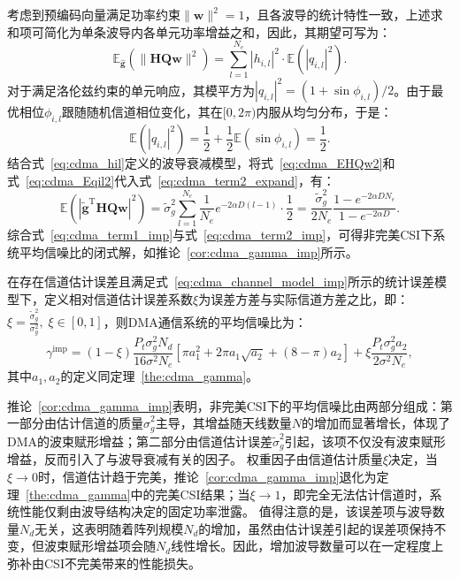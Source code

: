 考虑到预编码向量满足功率约束$\|\bm w\|^2 = 1$，且各波导的统计特性一致，上述求和项可简化为单条波导内各单元功率增益之和，因此，其期望可写为：
\begin{equation}\label{eq:cdma_EHQw2}
	\mathbb{E}_{\hat{\bm g}}\left( \|\bm H \bm Q \bm w\|^2 \right) = \sum_{l=1}^{N_e} |h_{i,l}|^2 \cdot \mathbb{E}(|q_{i,l}|^2).
\end{equation}
对于满足洛伦兹约束的单元响应，其模平方为$|q_{i,l}|^2 = (1+\sin\phi_{i,l})/2$。由于最优相位$\phi_{i,l}$跟随随机信道相位变化，其在$[0, 2\pi)$内服从均匀分布，于是：
\begin{equation}\label{eq:cdma_Eqil2}
	\mathbb{E}(|q_{i,l}|^2) = \frac{1}{2}+\frac{1}{2}\mathbb{E}(\sin\phi_{i,l})
	=\frac{1}{2}.
\end{equation}
结合式~\eqref{eq:cdma_hil}定义的波导衰减模型，将式~\eqref{eq:cdma_EHQw2}和式~\eqref{eq:cdma_Eqil2}代入式~\eqref{eq:cdma_term2_expand}，有：
\begin{equation}\label{eq:cdma_term2_imp}
	\mathbb{E}( \left| \bm{\tilde{g}}^\mathrm{T} \bm H \bm Q \bm w \right|^2 ) 
	= \tilde{\sigma}_g^2 \sum_{l=1}^{N_e} \frac{1}{N_e} e^{-2\alpha D(l-1)} \cdot \frac{1}{2} 
	= \frac{\tilde{\sigma}_g^2}{2N_e} \frac{1 - e^{-2\alpha D N_e}}{1 - e^{-2\alpha D}}.
\end{equation}
综合式~\eqref{eq:cdma_term1_imp}与式~\eqref{eq:cdma_term2_imp}，可得非完美CSI下系统平均信噪比的闭式解，如推论~\ref{cor:cdma_gamma_imp}所示。

\begin{corollary}\label{cor:cdma_gamma_imp}
	在存在信道估计误差且满足式~\eqref{eq:cdma_channel_model_imp}所示的统计误差模型下，定义相对信道估计误差系数$\xi$为误差方差与实际信道方差之比，即：$\xi = \frac{\tilde{\sigma}_g^2}{\sigma_g^2}, \; \xi \in [0, 1]$，则DMA通信系统的平均信噪比为：
	\begin{equation}
		\gamma^{\mathrm{imp}} = (1-\xi)\frac{P_{t}\sigma_g^2 N_d}{16\sigma^2 N_e}\left[\pi a_1^2 + 2\pi a_1\sqrt{a_2} + (8-\pi) a_2\right] 
		+ \xi \frac{P_t \sigma_g^2 a_2}{2 \sigma^2 N_e},
	\end{equation}
	其中$a_1, a_2$的定义同定理~\ref{the:cdma_gamma}。
\end{corollary}

推论~\ref{cor:cdma_gamma_imp}表明，非完美CSI下的平均信噪比由两部分组成：第一部分由估计信道的质量$\hat{\sigma}_g^2$主导，其增益随天线数量$N$的增加而显著增长，体现了DMA的波束赋形增益；第二部分由信道估计误差$\tilde{\sigma}_g^2$引起，该项不仅没有波束赋形增益，反而引入了与波导衰减有关的因子。
权重因子由信道估计质量$\xi$决定，当$\xi \to 0$时，信道估计趋于完美，推论~\ref{cor:cdma_gamma_imp}退化为定理~\ref{the:cdma_gamma}中的完美CSI结果；当$\xi \to 1$，即完全无法估计信道时，系统性能仅剩由波导结构决定的固定功率泄露。
值得注意的是，该误差项与波导数量$N_d$无关，这表明随着阵列规模$N_d$的增加，虽然由估计误差引起的误差项保持不变，但波束赋形增益项会随$N_d$线性增长。因此，增加波导数量可以在一定程度上弥补由CSI不完美带来的性能损失。


